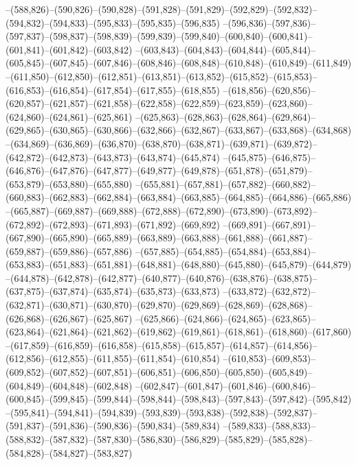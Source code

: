--(588,826)--(590,826)--(590,828)--(591,828)--(591,829)--(592,829)--(592,832)--(594,832)--(594,833)--(595,833)--(595,835)--(596,835)
--(596,836)--(597,836)--(597,837)--(598,837)--(598,839)--(599,839)--(599,840)--(600,840)--(600,841)--(601,841)--(601,842)--(603,842)
--(603,843)--(604,843)--(604,844)--(605,844)--(605,845)--(607,845)--(607,846)--(608,846)--(608,848)--(610,848)--(610,849)--(611,849)
--(611,850)--(612,850)--(612,851)--(613,851)--(613,852)--(615,852)--(615,853)--(616,853)--(616,854)--(617,854)--(617,855)--(618,855)
--(618,856)--(620,856)--(620,857)--(621,857)--(621,858)--(622,858)--(622,859)--(623,859)--(623,860)--(624,860)--(624,861)--(625,861)
--(625,863)--(628,863)--(628,864)--(629,864)--(629,865)--(630,865)--(630,866)--(632,866)--(632,867)--(633,867)--(633,868)--(634,868)
--(634,869)--(636,869)--(636,870)--(638,870)--(638,871)--(639,871)--(639,872)--(642,872)--(642,873)--(643,873)--(643,874)--(645,874)
--(645,875)--(646,875)--(646,876)--(647,876)--(647,877)--(649,877)--(649,878)--(651,878)--(651,879)--(653,879)--(653,880)--(655,880)
--(655,881)--(657,881)--(657,882)--(660,882)--(660,883)--(662,883)--(662,884)--(663,884)--(663,885)--(664,885)--(664,886)--(665,886)
--(665,887)--(669,887)--(669,888)--(672,888)--(672,890)--(673,890)--(673,892)--(672,892)--(672,893)--(671,893)--(671,892)--(669,892)
--(669,891)--(667,891)--(667,890)--(665,890)--(665,889)--(663,889)--(663,888)--(661,888)--(661,887)--(659,887)--(659,886)--(657,886)
--(657,885)--(654,885)--(654,884)--(653,884)--(653,883)--(651,883)--(651,881)--(648,881)--(648,880)--(645,880)--(645,879)--(644,879)
--(644,878)--(642,878)--(642,877)--(640,877)--(640,876)--(638,876)--(638,875)--(637,875)--(637,874)--(635,874)--(635,873)--(633,873)
--(633,872)--(632,872)--(632,871)--(630,871)--(630,870)--(629,870)--(629,869)--(628,869)--(628,868)--(626,868)--(626,867)--(625,867)
--(625,866)--(624,866)--(624,865)--(623,865)--(623,864)--(621,864)--(621,862)--(619,862)--(619,861)--(618,861)--(618,860)--(617,860)
--(617,859)--(616,859)--(616,858)--(615,858)--(615,857)--(614,857)--(614,856)--(612,856)--(612,855)--(611,855)--(611,854)--(610,854)
--(610,853)--(609,853)--(609,852)--(607,852)--(607,851)--(606,851)--(606,850)--(605,850)--(605,849)--(604,849)--(604,848)--(602,848)
--(602,847)--(601,847)--(601,846)--(600,846)--(600,845)--(599,845)--(599,844)--(598,844)--(598,843)--(597,843)--(597,842)--(595,842)
--(595,841)--(594,841)--(594,839)--(593,839)--(593,838)--(592,838)--(592,837)--(591,837)--(591,836)--(590,836)--(590,834)--(589,834)
--(589,833)--(588,833)--(588,832)--(587,832)--(587,830)--(586,830)--(586,829)--(585,829)--(585,828)--(584,828)--(584,827)--(583,827)
